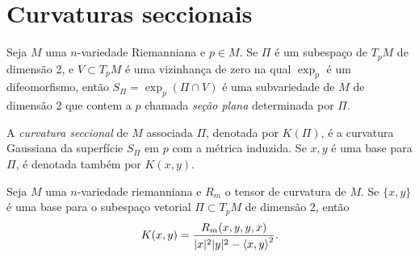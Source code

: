 



\section{Curvaturas seccionais}

\begin{definicao}
	Seja $M$ uma $n$-variedade Riemanniana e $p \in M$. Se $\Pi$ é um subespaço de $T_p M$ de dimensão 2, e $V \subset T_p M$ é uma vizinhança de zero  na qual $\exp_p$ é um difeomorfismo, então $S_{\Pi} = \exp_p(\Pi \cap V)$ é uma subvariedade de $M$ de dimensão 2 que contem a  $p$ chamada \emph{seção plana} determinada por $\Pi$.
\end{definicao}

\begin{definicao}
	A \emph{curvatura seccional} de $M$ associada $\Pi$, denotada por $K(\Pi)$, é a curvatura Gaussiana da superfície $S_{\Pi}$ em $p$ com a métrica induzida. Se $x,y$ é uma base para $\Pi$, é denotada também por $K(x,y)$.
\end{definicao}

\begin{proposicao}
	Seja $M$ uma $n$-variedade riemanniana e
	$R_m$ o tensor de curvatura de $M$.
	Se $\{ x,y \}$ é uma base para o subespaço vetorial $\Pi \subset T_p M$ de dimensão 2, então
	\begin{equation*}
	K(x,y) = \frac{R_m(x,y,y,x)}{|x|^2 |y|^2 - \left\langle x,y \right\rangle^2}.
	\end{equation*}
\end{proposicao}

